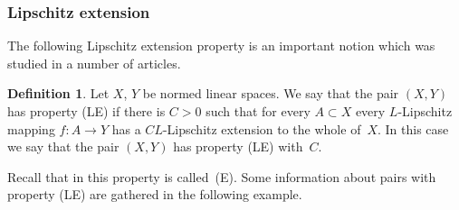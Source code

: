 \documentclass[a4paper,twoside,10pt,reqno,draft]{amsart}
\theoremstyle{definition}
\newtheorem{definition}[theorem]{Definition}
\theoremstyle{remark}
\newcommand\pLE{(LE)}
\begin{document}
\subsubsection{Lipschitz extension}
The following Lipschitz extension property is an important notion which was studied in a number of articles.
\begin{definition}
Let $X$, $Y$ be normed linear spaces.
We say that the pair $(X,Y)$ has property {\pLE} if there is $C>0$ such that for every $A\subset X$ every $L$-Lipschitz mapping $f\colon A\to Y$ has a $CL$-Lipschitz extension to the whole of~$X$.
In this case we say that the pair $(X,Y)$ has property {\pLE} with~$C$.
\end{definition}
Recall that in \cite{JS2} this property is called~(E).
Some information about pairs with property {\pLE} are gathered in the following example.
\end{document}
